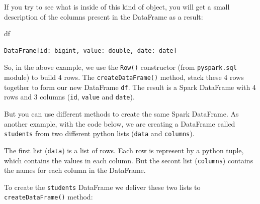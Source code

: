 \documentclass[
  11pt,
  letterpaper,
  DIV=11,
  numbers=noendperiod]{scrreprt}
\newenvironment{Shaded}{\begin{snugshade}}{\end{snugshade}}
\newcommand{\NormalTok}[1]{\textcolor[rgb]{0.00,0.23,0.31}{#1}}
\begin{document}
If you try to see what is inside of this kind of object, you will get a
small description of the columns present in the DataFrame as a result:

\begin{Shaded}
\begin{Highlighting}[]
\NormalTok{df}
\end{Highlighting}
\end{Shaded}

\begin{verbatim}
DataFrame[id: bigint, value: double, date: date]
\end{verbatim}

So, in the above example, we use the \texttt{Row()} constructor (from
\texttt{pyspark.sql} module) to build 4 rows. The
\texttt{createDataFrame()} method, stack these 4 rows together to form
our new DataFrame \texttt{df}. The result is a Spark DataFrame with 4
rows and 3 columns (\texttt{id}, \texttt{value} and \texttt{date}).

But you can use different methods to create the same Spark DataFrame. As
another example, with the code below, we are creating a DataFrame called
\texttt{students} from two different python lists (\texttt{data} and
\texttt{columns}).

The first list (\texttt{data}) is a list of rows. Each row is represent
by a python tuple, which contains the values in each column. But the
secont list (\texttt{columns}) contains the names for each column in the
DataFrame.

To create the \texttt{students} DataFrame we deliver these two lists to
\texttt{createDataFrame()} method:
\end{document}
